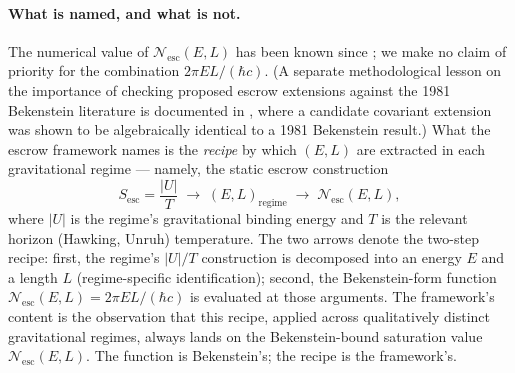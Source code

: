 \documentclass[11pt]{article}
\begin{document}
\paragraph{What is named, and what is not.} The numerical value of $\mathcal{N}_{\mathrm{esc}}(E, L)$ has been known since \cite{Bekenstein1981}; we make no claim of priority for the combination $2\pi E L/(\hbar c)$. (A separate methodological lesson on the importance of checking proposed escrow extensions against the 1981 Bekenstein literature is documented in \cite{Whitmer2026C8}, where a candidate covariant extension was shown to be algebraically identical to a 1981 Bekenstein result.) What the escrow framework names is the \emph{recipe} by which $(E, L)$ are extracted in each gravitational regime — namely, the static escrow construction
\begin{equation}
S_{\mathrm{esc}} = \frac{|U|}{T} \;\longrightarrow\; (E, L)_{\text{regime}} \;\longrightarrow\; \mathcal{N}_{\mathrm{esc}}(E, L),
\label{eq:escrow_recipe}
\end{equation}
where $|U|$ is the regime's gravitational binding energy and $T$ is the relevant horizon (Hawking, Unruh) temperature. The two arrows denote the two-step recipe: first, the regime's $|U|/T$ construction is decomposed into an energy $E$ and a length $L$ (regime-specific identification); second, the Bekenstein-form function $\mathcal{N}_{\mathrm{esc}}(E, L) = 2\pi E L/(\hbar c)$ is evaluated at those arguments. The framework's content is the observation that this recipe, applied across qualitatively distinct gravitational regimes, always lands on the Bekenstein-bound saturation value $\mathcal{N}_{\mathrm{esc}}(E, L)$. The function is Bekenstein's; the recipe is the framework's.
\end{document}
